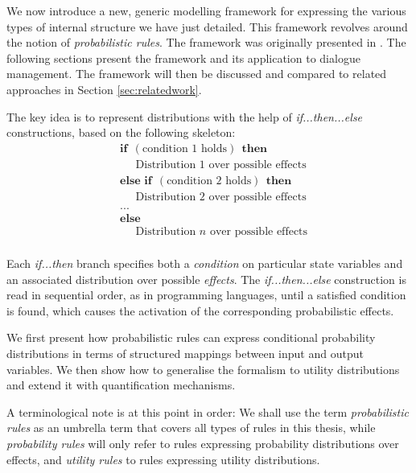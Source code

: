 We now introduce a new, generic modelling framework for expressing the various types of internal structure we have just detailed.  This framework revolves around the notion of \textit{probabilistic rules}. The framework was originally presented in \cite{rulebasedmodels-sigdial2012,lison-semdial2012}. The following sections present the framework and its application to dialogue management.  The framework will then be discussed and compared to related approaches in Section \ref{sec:relatedwork}.

The key idea is to represent distributions with the help of \textit{if...then...else} constructions, based on the following skeleton:
\begin{equation*}
\begin{aligned}
& \textbf{if} \ \ (\text{condition 1 holds}) \ \ \textbf{then} \\ 
& \;\;\;\;\; \text{Distribution 1 over possible effects} \\
& \textbf{else if} \ \ (\text{condition 2 holds}) \ \ \textbf{then} \\ 
& \;\;\;\;\; \text{Distribution 2 over possible effects} \\
& ... \\
& \textbf{else} \\
& \;\;\;\;\; \text{Distribution } n \text{ over possible effects} \\ 
\end{aligned}
\end{equation*}

Each \textit{if...then} branch specifies both a \textit{condition} on particular state variables and an associated distribution over possible \textit{effects}.   The \textit{if...then...else} construction is read in sequential order, as in programming languages, until a satisfied condition is found, which causes the activation of the corresponding probabilistic effects. 

We first present how probabilistic rules can express conditional probability distributions in terms of structured mappings between input and output variables.  We then show how to  generalise the formalism to utility distributions and extend it with quantification mechanisms.

A terminological note is at this point in order: We shall use the term \textit{probabilistic rules} as an umbrella term that covers all types of rules in this thesis, while \textit{probability rules} will only refer to rules expressing probability distributions over effects, and \textit{utility rules} to rules expressing utility distributions.


